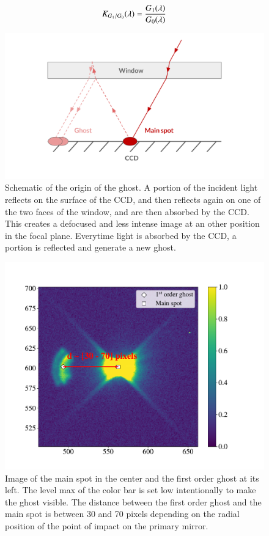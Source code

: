 \begin{equation}
    K_{G_1/G_0}(\lambda) = \frac{G_1(\lambda)}{G_0(\lambda)}
    \label{eq:ratio_ghost}
\end{equation}

\begin{figure}[h]
    \centering
    \includegraphics[width=\columnwidth]{fig/schema_ghost.pdf}
    \caption{Schematic of the origin of the ghost. A portion of the incident light reflects on the surface of the CCD, and then reflects again on one of the two faces of the window, and are then absorbed by the CCD. This creates a defocused and less intense image at an other position in the focal plane. Everytime light is absorbed by the CCD, a portion is reflected and generate a new ghost.}
    \label{fig:schema_ghost}
\end{figure}

\begin{figure}[h]
    \centering
    \includegraphics[width=\columnwidth]{fig/ghost_contrast.pdf}
    \caption{Image of the main spot in the center and the first order ghost at its left. The level max of the color bar is set low intentionally to make the ghost visible. The distance between the first order ghost and the main spot is between 30 and 70 pixels depending on the radial position of the point of impact on the \SD primary mirror.}
    \label{fig:ghost_contrast}
\end{figure}



